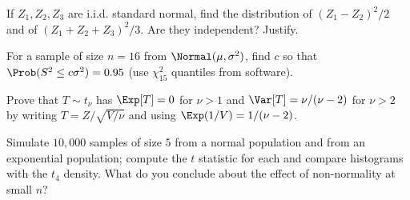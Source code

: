 \begin{exercise}
If $Z_1,Z_2,Z_3$ are i.i.d. standard normal, find the distribution of $(Z_1-Z_2)^2/2$ and of $(Z_1+Z_2+Z_3)^2/3$. Are they independent? Justify.
\end{exercise}

\begin{exercise}
For a sample of size $n=16$ from $\Normal(\mu,\sigma^2)$, find $c$ so that $\Prob(S^2\le c\sigma^2)=0.95$ (use $\chi^2_{15}$ quantiles from software).
\end{exercise}

\begin{exercise}
Prove that $T\sim t_\nu$ has $\Exp[T]=0$ for $\nu>1$ and $\Var[T]=\nu/(\nu-2)$ for $\nu>2$ by writing $T=Z/\sqrt{V/\nu}$ and using $\Exp(1/V)=1/(\nu-2)$.
\end{exercise}

\begin{exercise}
Simulate $10{,}000$ samples of size $5$ from a normal population and from an exponential population; compute the $t$ statistic for each and compare histograms with the $t_4$ density. What do you conclude about the effect of non-normality at small $n$?
\end{exercise}
